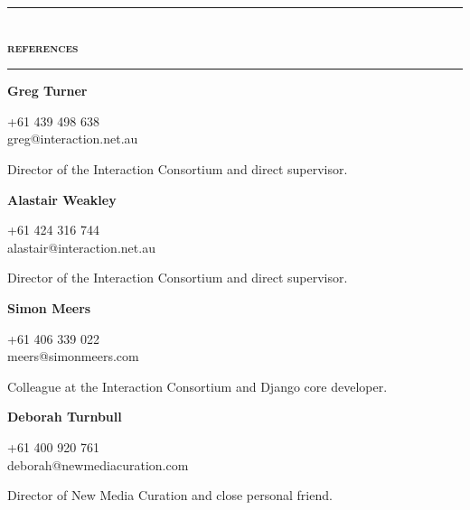 \documentclass[a4paper,12pt]{article}
\begin{document}
\begin{spacing}{0.95}
\rule[1mm]{\linewidth}{1mm}\\
{\Large\textsc{\textbf{references}}}\\
\rule[1mm]{\linewidth}{1mm}

\vspace{2mm}
\begin{minipage}[t]{45mm}
	{\small%
		\textbf{\textsf{Greg Turner}}\\
		\vspace{-4mm}\begin{spacing}{0.7}{\footnotesize{\condensed +61 439 498 638\\greg@interaction.net.au}}\\\end{spacing}
		\vspace{-1mm}Director of the Interaction Consortium and direct supervisor.%
	}%
\end{minipage}%
\hspace{5mm}%
\begin{minipage}[t]{45mm}
	{\small%
		\textbf{\textsf{Alastair Weakley}}\\
		\vspace{-4mm}\begin{spacing}{0.7}{\footnotesize{\condensed +61 424 316 744\\alastair@interaction.net.au}}\\\end{spacing}
		\vspace{-1mm}Director of the Interaction Consortium and direct supervisor.%
	}%
\end{minipage}%
\hspace{5mm}%
\begin{minipage}[t]{45mm}
	{\small%
		\textbf{\textsf{Simon Meers}}\\
		\vspace{-4mm}\begin{spacing}{0.7}{\footnotesize{\condensed +61 406 339 022\\meers@simonmeers.com}}\\\end{spacing}
		\vspace{-1mm}Colleague at the Interaction Consortium and Django core developer.%
	}%
\end{minipage}%
\hspace{5mm}%
\begin{minipage}[t]{45mm}
	{\small%
		\textsf{\textbf{Deborah Turnbull}}\\
		\vspace{-4mm}\begin{spacing}{0.7}{\footnotesize{\condensed +61 400 920 761\\deborah@newmediacuration.com}}\\\end{spacing}
		\vspace{-1mm}Director of New Media Curation and close personal friend.%
	}%
\end{minipage}
\end{spacing}
\end{document}
